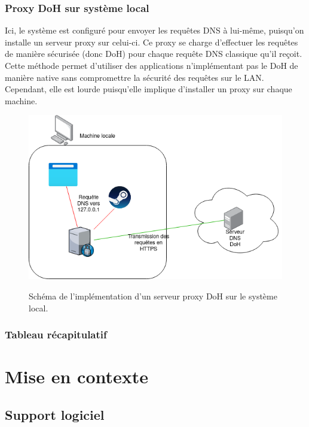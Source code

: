 \documentclass[a4paper,12pt]{article}
\begin{document}
	\subsubsection{Proxy DoH sur système local}
	
	Ici, le système est configuré pour envoyer les requêtes DNS à lui-même, puisqu'on installe un serveur proxy sur celui-ci. Ce proxy se charge d'effectuer les requêtes de manière sécurisée (donc DoH) pour chaque requête DNS classique qu'il reçoit.
	Cette méthode permet d'utiliser des applications n'implémentant pas le DoH de manière native sans compromettre la sécurité des requêtes sur le LAN. Cependant, elle est lourde puisqu'elle implique d'installer un proxy sur chaque machine.
	
	\begin{figure}[H]
		\begin{center}
			{\includegraphics[scale=0.6]{Images/schema_doh_proxy_local.png}}
		\end{center}
		\caption{Schéma de l'implémentation d'un serveur proxy DoH sur le système local.}
	\end{figure}
	
	\subsubsection{Tableau récapitulatif}
	
	\section{Mise en contexte}
	
	\subsection{Support logiciel}
	
\end{document}
